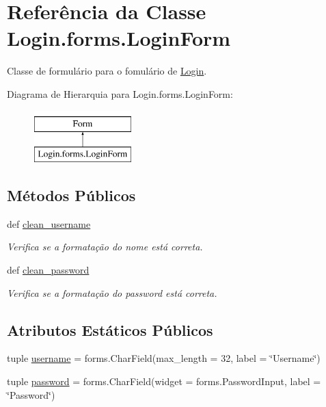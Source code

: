 \hypertarget{classLogin_1_1forms_1_1LoginForm}{\section{Referência da Classe Login.\-forms.\-Login\-Form}
\label{d0/db9/classLogin_1_1forms_1_1LoginForm}
}


Classe de formulário para o fomulário de \hyperlink{namespaceLogin}{Login}.  


Diagrama de Hierarquia para Login.\-forms.\-Login\-Form\-:\begin{figure}[H]
\begin{center}
\leavevmode
\includegraphics[height=2.000000cm]{d0/db9/classLogin_1_1forms_1_1LoginForm}
\end{center}
\end{figure}
\subsection*{Métodos Públicos}
\begin{DoxyCompactItemize}
\item 
def \hyperlink{classLogin_1_1forms_1_1LoginForm_a411400c2fe891080a2ccb332dd0117bf}{clean\-\_\-username}
\begin{DoxyCompactList}\small\item\em Verifica se a formatação do nome está correta. \end{DoxyCompactList}\item 
def \hyperlink{classLogin_1_1forms_1_1LoginForm_a693547dba5ad5addb8f0540711441713}{clean\-\_\-password}
\begin{DoxyCompactList}\small\item\em Verifica se a formatação do password está correta. \end{DoxyCompactList}\end{DoxyCompactItemize}
\subsection*{Atributos Estáticos Públicos}
\begin{DoxyCompactItemize}
\item 
tuple \hyperlink{classLogin_1_1forms_1_1LoginForm_af3766bb4ea8cabdf57ad77214b7545fd}{username} = forms.\-Char\-Field(max\-\_\-length = 32, label = \char`\"{}Username\char`\"{})
\item 
tuple \hyperlink{classLogin_1_1forms_1_1LoginForm_a23e321f790e9c7bfc3e9abf767826a2d}{password} = forms.\-Char\-Field(widget = forms.\-Password\-Input, label = \char`\"{}Password\char`\"{})
\end{DoxyCompactItemize}


